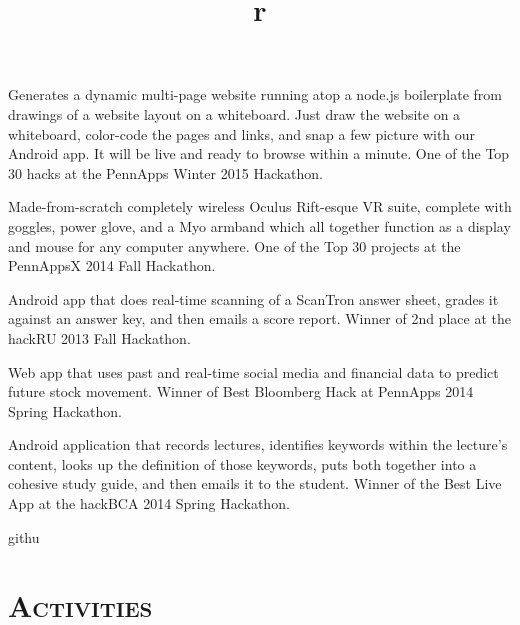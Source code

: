 \begin{resume}
\begin{position}
Generates a dynamic multi-page website running atop a node.js boilerplate from drawings of a website layout on a whiteboard. Just draw the website on a whiteboard, color-code the pages and links, and snap a few picture with our Android app. It will be live and ready to browse within a minute. One of the Top 30 hacks at the PennApps Winter 2015 Hackathon.
\end{position}

\begin{position}
Made-from-scratch completely wireless Oculus Rift-esque VR suite, complete with goggles, power glove, and a Myo armband which all together function as a display and mouse for any computer anywhere. One of the Top 30 projects at the PennAppsX 2014 Fall Hackathon.
\end{position}

\begin{position}
Android app that does real-time scanning of a ScanTron answer sheet, grades it against an answer key, and then emails a score report. Winner of 2nd place at the hackRU 2013 Fall Hackathon.
\end{position}

\begin{position}
Web app that uses past and real-time social media and financial data to predict future stock movement. Winner of Best Bloomberg Hack at PennApps 2014 Spring Hackathon.
\end{position}

\begin{position}
Android application that records lectures, identifies keywords within the lecture's content, looks up the definition of those keywords, puts both together into a cohesive study guide, and then emails it to the student. Winner of the Best Live App at the hackBCA 2014 Spring Hackathon. 
\end{position}
githu
\section{\textsc{Activities}}

\begin{formatb}
  \title{r}\\
  \body\\
\end{formatb}


\end{resume}
